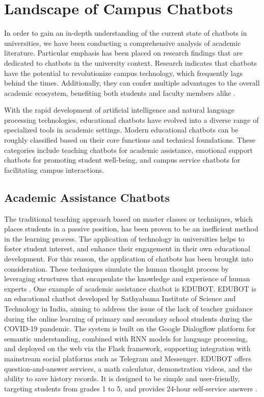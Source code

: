 \documentclass{xum_review}
\begin{document}
\section{Landscape of Campus Chatbots}
In order to gain an in-depth understanding of the current state of chatbots in
universities, we have been conducting a comprehensive analysis of academic
literature. Particular emphasis has been placed on research findings that are
dedicated to chatbots in the university context. Research indicates that
chatbots have the potential to revolutionize campus technology, which frequently
lags behind the times. Additionally, they can confer multiple advantages to the
overall academic ecosystem, benefiting both students and faculty members alike
\citep{dibitonto2018chatbot}.

With the rapid development of artificial intelligence and natural language
processing technologies, educational chatbots have evolved into a diverse range
of specialized tools in academic settings. Modern educational chatbots can be
roughly classified based on their core functions and technical foundations.
These categories include teaching chatbots for academic assistance, emotional
support chatbots for promoting student well-being, and campus service chatbots for
facilitating campus interactions.

\subsection{Academic Assistance Chatbots}

The traditional teaching approach based on master classes or techniques, which
places students in a passive position, has been proven to be an inefficient
method in the learning process. The application of technology in universities
helps to foster student interest, and enhance their engagement in their
own educational development. For this reason, the application of chatbots has
been brought into consideration. These techniques simulate the human thought
process by leveraging structures that encapsulate the knowledge and experience
of human experts \citep{villegas2020proposal}. One
example of academic assistance chatbot is EDUBOT. EDUBOT is an educational
chatbot developed by Sathyabama Institute of Science and Technology in India,
aiming to address the issue of the lack of teacher guidance during the online
learning of primary and secondary school students during the COVID-19 pandemic.
The system is built on the Google Dialogflow platform for semantic
understanding, combined with RNN models for language processing, and deployed on
the web via the Flask framework, supporting integration with mainstream social
platforms such as Telegram and Messenger. EDUBOT offers question-and-answer
services, a math calculator, demonstration videos, and the ability to save
history records. It is designed to be simple and user-friendly, targeting
students from grades 1 to 5, and provides 24-hour self-service answers \citep{sophia2021edubot}.
\end{document}
